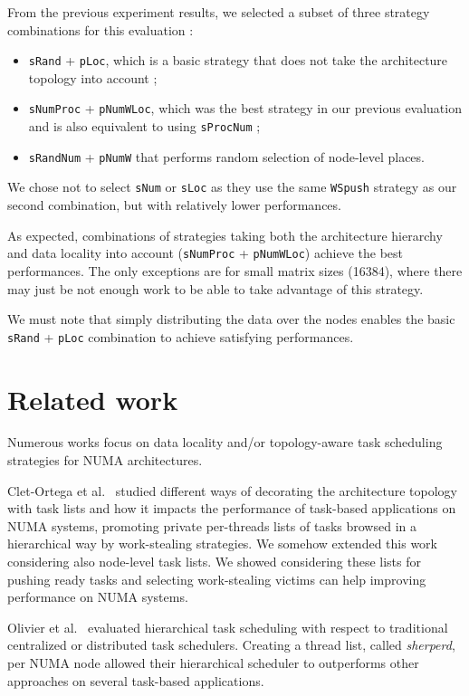 \documentclass{Styles/llncs}
\begin{document}
From the previous experiment results, we selected a subset of three strategy
combinations for this evaluation :
\begin{itemize}
  \item \verb/sRand/ + \verb/pLoc/, which is a basic strategy that does not take the architecture topology into account ;
  \item \verb/sNumProc/ + \verb/pNumWLoc/, which was the best strategy in our previous
    evaluation and is also equivalent to using \verb/sProcNum/ ;
  \item \verb/sRandNum/ + \verb/pNumW/ that performs random selection of node-level places.
\end{itemize}
We chose not to select \verb/sNum/ or \verb/sLoc/ as they use the same \verb/WSpush/ strategy
as our second combination, but with relatively lower performances.

As expected, combinations of strategies taking both the architecture hierarchy and data locality into account (\verb/sNumProc/
+ \verb/pNumWLoc/) achieve the best performances.
The only exceptions are for small matrix sizes (16384), where there may just be
not enough work to be able to take advantage of this strategy.

We must note that simply distributing the data over the nodes enables the basic
\verb/sRand/ + \verb/pLoc/ combination to achieve satisfying performances.

\section{Related work}
\label{sec:related-work}

Numerous works focus on data locality and/or topology-aware task scheduling strategies for
NUMA architectures.

Clet-Ortega et al.~\cite{DBLP:conf/europar/Clet-OrtegaCP14} studied different ways of decorating the architecture topology with task lists and how it impacts the performance of task-based applications on NUMA systems, promoting private per-threads lists of tasks browsed in a hierarchical way by work-stealing strategies.
We somehow extended this work considering also node-level task lists. We showed considering these lists for pushing ready tasks and selecting work-stealing victims can help improving performance on NUMA systems.

Olivier et al.~\cite{DBLP:journals/ijhpca/OlivierPWSP12} evaluated hierarchical task scheduling with respect to traditional centralized or distributed task schedulers. Creating a thread list, called \emph{sherperd}, per NUMA node allowed their hierarchical scheduler to outperforms other approaches on several task-based applications. 
\end{document}
